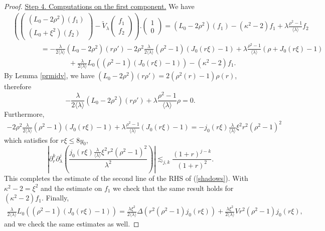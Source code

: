 \documentclass[11 pt]{amsart}
\theoremstyle{definition}
\theoremstyle{remark}
\numberwithin{equation}{section}
\begin{document}
\begin{proof}
\medskip
\noindent \underline{Step 4. Computations on the first component.}
  We have
\begin{equation}
\label{shadows}
\begin{split}
& \left( \left(\begin{array}{c}
      (L_0 - 2 \rho^2) (f_1)\\
      (L_0 + \xi^2) (f_2)
    \end{array}\right) - \widetilde{V}_{\lambda} \left(\begin{array}{c}
      f_1\\
      f_2
    \end{array}\right) \right) . \left(\begin{array}{c}
      1\\
      0
    \end{array}\right) = (L_0 - 2 \rho^2) (f_1) - (\kappa^2 - 2) f_1 + \lambda \frac{\rho^2
    - 1}{\langle \lambda \rangle} f_2 \\
& \qquad \qquad =  - \frac{\lambda}{2 \langle \lambda \rangle} (L_0 - 2 \rho^2) (r\rho') - 2 \rho^2 \frac{\lambda}{2 \langle \lambda \rangle} (\rho^2 - 1)
    (J_0 (r \xi) - 1) + \lambda \frac{\rho^2 - 1}{\langle \lambda \rangle}
    (\rho + J_0 (r \xi) - 1)  \\
& \qquad \qquad \qquad \qquad +  \frac{\lambda}{2 \langle \lambda \rangle} L_0 ((\rho^2 - 1) (J_0 (r
    \xi) - 1)) - (\kappa^2 - 2) f_1 .  
\end{split}
\end{equation}
  By Lemma \ref{prmidv}, we have $(L_0 - 2 \rho^2) (r \rho') = 2 (\rho^2 (r) -
  1) \rho (r)$, therefore
  \[ - \frac{\lambda}{2 \langle \lambda \rangle} (L_0 - 2 \rho^2) (r \rho') +
     \lambda \frac{\rho^2 - 1}{\langle \lambda \rangle} \rho = 0. \]
  Furthermore,
  \begin{eqnarray*}
- 2 \rho^2 \frac{\lambda}{2 \langle \lambda \rangle} (\rho^2 - 1)
    (J_0 (r \xi) - 1) + \lambda \frac{\rho^2 - 1}{\langle \lambda \rangle}
    (J_0 (r \xi) - 1) =  - j_0 (r \xi) \frac{\lambda}{\langle \lambda \rangle} \xi^2 r^2
    (\rho^2 - 1)^2
  \end{eqnarray*}
  which satisfies for $r \xi \leqslant 8 y_0$,
  \[ \left| \partial_r^k \partial_{\lambda}^j \left( \frac{j_0 (r \xi)
     \frac{\lambda}{\langle \lambda \rangle} \xi^2 r^2 (\rho^2 -
     1)^2}{\lambda^2} \right) \right| \lesssim_{j, k} \frac{(1 + r)^{j -
     k}}{(1 + r)^2} . \]
  This completes the estimate of the second line of the RHS of (\ref{shadows}).
  With $\kappa^2 - 2 = \xi^2$ and the estimate on $f_1$ we check that the same
  result holds for $(\kappa^2 - 2) f_1$. Finally,
  \begin{eqnarray*}
\frac{\lambda}{2 \langle \lambda \rangle} L_0 ((\rho^2 - 1) (J_0 (r
    \xi) - 1)) =  \frac{\lambda \xi^2}{2 \langle \lambda \rangle} \Delta (r^2 (\rho^2
    - 1) j_0 (r \xi)) + \frac{\lambda \xi^2}{2 \langle \lambda \rangle} V r^2
    (\rho^2 - 1) j_0 (r \xi),
  \end{eqnarray*}
  and we check the same estimates as well.
\end{proof}
\end{document}
